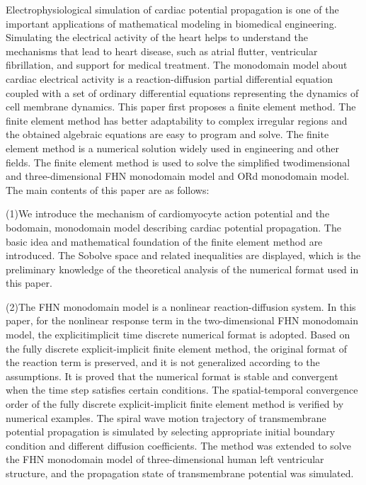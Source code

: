 \documentclass[twoside,UTF8]{nputhesis}
\begin{document}
\begin{Abstract}
Electrophysiological simulation of cardiac potential propagation is one of the important applications of mathematical modeling in biomedical engineering. Simulating the electrical activity of the heart helps to understand the mechanisms that lead to heart disease, such as atrial flutter, ventricular fibrillation, and support for medical treatment. The monodomain model about cardiac electrical activity is a reaction-diffusion partial differential equation coupled with a set of ordinary differential equations representing the dynamics of cell membrane dynamics. This paper first proposes a finite element method. The finite element method
has better adaptability to complex irregular regions and the obtained algebraic equations are easy to program and solve. The finite element method is a numerical solution widely used in
engineering and other fields. The finite element method is used to solve the simplified twodimensional and three-dimensional FHN monodomain model and ORd monodomain model.
The main contents of this paper are as follows:

(1)We introduce the mechanism of cardiomyocyte action potential and the bodomain, monodomain model describing cardiac potential propagation. The basic idea and mathematical foundation of the finite element method are introduced. The Sobolve space and related
inequalities are displayed, which is the preliminary knowledge of the theoretical analysis of the numerical format used in this paper.

(2)The FHN monodomain model is a nonlinear reaction-diffusion system. In this paper, for the nonlinear response term in the two-dimensional FHN monodomain model, the explicitimplicit
time discrete numerical format is adopted. Based on the fully discrete explicit-implicit finite element method, the original format of the reaction term is preserved, and it is not generalized
according to the assumptions. It is proved that the numerical format is stable and convergent when the time step satisfies certain conditions. The spatial-temporal convergence
order of the fully discrete explicit-implicit finite element method is verified by numerical examples. The spiral wave motion trajectory of transmembrane potential propagation is simulated
by selecting appropriate initial boundary condition and different diffusion coefficients.
The method was extended to solve the FHN monodomain model of three-dimensional human left ventricular structure, and the propagation state of transmembrane potential was simulated.


\end{Abstract}
\end{document}
